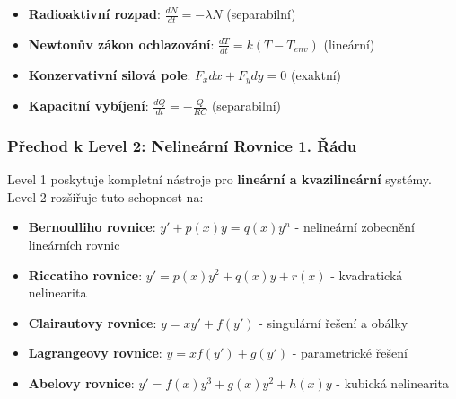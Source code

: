 \vspace{0.6\baselineskip}

\begin{application}
\label{app:fyzikalni-systemy-level1}
\begin{itemize}
\item \textbf{Radioaktivní rozpad}: $\frac{dN}{dt} = -\lambda N$ (separabilní)
\item \textbf{Newtonův zákon ochlazování}: $\frac{dT}{dt} = k(T - T_{env})$ (lineární)
\item \textbf{Konzervativní silová pole}: $F_x dx + F_y dy = 0$ (exaktní)
\item \textbf{Kapacitní vybíjení}: $\frac{dQ}{dt} = -\frac{Q}{RC}$ (separabilní)
\end{itemize}
\end{application}

\vspace{0.8\baselineskip}

\subsubsection{Přechod k Level 2: Nelineární Rovnice 1. Řádu}
\label{subsec:prechod-level2}

\begin{transition}
\label{trans:linearni-nelinearni}
Level 1 poskytuje kompletní nástroje pro \textbf{lineární a kvazilineární} systémy. Level 2 rozšiřuje tuto schopnost na:

\begin{itemize}
\item \textbf{Bernoulliho rovnice}: $y' + p(x)y = q(x)y^n$ - nelineární zobecnění lineárních rovnic
\item \textbf{Riccatiho rovnice}: $y' = p(x)y^2 + q(x)y + r(x)$ - kvadratická nelinearita
\item \textbf{Clairautovy rovnice}: $y = xy' + f(y')$ - singulární řešení a obálky
\item \textbf{Lagrangeovy rovnice}: $y = xf(y') + g(y')$ - parametrické řešení
\item \textbf{Abelovy rovnice}: $y' = f(x)y^3 + g(x)y^2 + h(x)y$ - kubická nelinearita
\end{itemize}
\end{transition}

\vspace{0.6\baselineskip}

